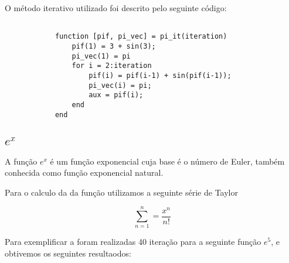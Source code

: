 			O método iterativo utilizado foi descrito pelo seguinte código:

			\begin{lstlisting}

			function [pif, pi_vec] = pi_it(iteration)
				pif(1) = 3 + sin(3);
				pi_vec(1) = pi
				for i = 2:iteration
					pif(i) = pif(i-1) + sin(pif(i-1));
					pi_vec(i) = pi;
					aux = pif(i);
				end
			end

			\end{lstlisting}

	\subsection{$e^x$}

		A função $e^x$ é um função exponencial cuja base é o número de Euler,
		também conhecida como função exponencial natural.

		Para o calculo da da função utilizamos a seguinte série de Taylor
		
		\begin{equation}
			\sum_{n=1}^{n} = \frac{x^n}{n!}
		\end{equation}

		Para exemplificar a foram realizadas 40 iteração para a seguinte função
		$e^5$, e obtivemos os seguintes resultaodos:


